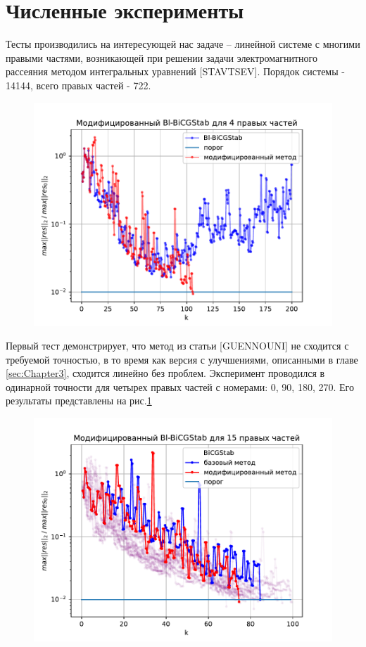 \section{Численные эксперименты}
\label{sec:Chapter4} 

\par Тесты производились на интересующей нас задаче – линейной системе с многими 
правыми частями, возникающей при решении задачи электромагнитного рассеяния 
методом интегральных уравнений [STAVTSEV]. Порядок системы - 14144, всего правых частей - 722.
\begin{figure}[H]
    \centering
    \includegraphics[width=0.7\linewidth]{images/4.pdf}
    \caption{}
    \label{fig:4}
\end{figure} 
\par Первый тест демонстрирует, что метод из статьи [GUENNOUNI] не сходится с требуемой точностью, в то время как 
версия с улучшениями, описанными в главе \ref{sec:Chapter3}, сходится линейно без проблем. 
Эксперимент проводился в одинарной точности для четырех правых частей с номерами: 0, 90, 180, 270. Его результаты представлены
на рис.\ref{fig:4}
\begin{figure}[H]
    \centering
    \includegraphics[width=0.7\linewidth]{images/acceleration_15_rhs.pdf}
    \caption{}
    \label{fig:acceleration_15}
\end{figure}
